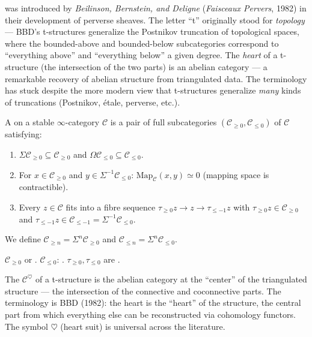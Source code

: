 \begin{nameorigin}
 was introduced by \emph{Beilinson, Bernstein, and
Deligne} (\emph{Faisceaux Pervers}, 1982) in their development of
perverse sheaves. The letter ``t'' originally stood for \emph{topology}
— BBD's t-structures generalize the Postnikov truncation of topological
spaces, where the bounded-above and bounded-below subcategories
correspond to ``everything above'' and ``everything below'' a given
degree. The \emph{heart} of a t-structure (the intersection of the two
parts) is an abelian category — a remarkable recovery of abelian
structure from triangulated data. The terminology has stuck despite
the more modern view that t-structures generalize \emph{many} kinds of
truncations (Postnikov, étale, perverse, etc.).
\end{nameorigin}

\begin{definition}[t-structure]
\label{def:t-structure}
A  on a stable $\infty$-category $\mathcal{C}$ is a
pair of full subcategories $(\mathcal{C}_{\geq 0}, \mathcal{C}_{\leq 0})$
of $\mathcal{C}$ satisfying:
\begin{enumerate}
  \item $\Sigma \mathcal{C}_{\geq 0} \subseteq \mathcal{C}_{\geq 0}$ and
        $\Omega \mathcal{C}_{\leq 0} \subseteq \mathcal{C}_{\leq 0}$.
  \item For $x \in \mathcal{C}_{\geq 0}$ and $y \in \Sigma^{-1} \mathcal{C}_{\leq 0}$:
        $\mathrm{Map}_\mathcal{C}(x, y) \simeq 0$ (mapping space is contractible).
  \item Every $z \in \mathcal{C}$ fits into a fibre sequence
        $\tau_{\geq 0} z \to z \to \tau_{\leq -1} z$
        with $\tau_{\geq 0} z \in \mathcal{C}_{\geq 0}$ and $\tau_{\leq -1} z
        \in \mathcal{C}_{\leq -1} = \Sigma^{-1} \mathcal{C}_{\leq 0}$.
\end{enumerate}
We define $\mathcal{C}_{\geq n} = \Sigma^n \mathcal{C}_{\geq 0}$ and
$\mathcal{C}_{\leq n} = \Sigma^n \mathcal{C}_{\leq 0}$.
\end{definition}

\begin{howtosay}
$\mathcal{C}_{\geq 0}$  or
. $\mathcal{C}_{\leq 0}$:
. $\tau_{\geq 0}, \tau_{\leq 0}$ are
.
\end{howtosay}

\begin{nameorigin}
The  $\mathcal{C}^\heartsuit$ of a t-structure is the
abelian category at the ``center'' of the triangulated structure — the
intersection of the connective and coconnective parts. The terminology
is BBD (1982): the heart is the ``heart'' of the structure, the central
part from which everything else can be reconstructed via cohomology
functors. The symbol $\heartsuit$ (heart suit) is universal across the
literature.
\end{nameorigin}

